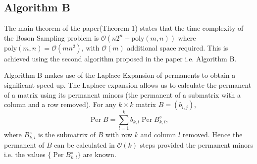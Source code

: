 \documentclass[11pt]{article}
\theoremstyle{theorem}
\theoremstyle{remark}
\theoremstyle{plain}
\theoremstyle{definition}
\DeclareMathOperator*{\Per}{\mathrm{Per}}
\begin{document}
\subsection{Algorithm B} \label{sec:algB}
The main theorem of the paper(Theorem 1) states that the time complexity of the Boson Sampling problem is $\mathcal{O}(n2^n + \text{poly}(m, n))$ where $ \text{poly}(m, n) = \mathcal{O}(mn^2)$, with $\mathcal{O}(m)$ additional space required. This is achieved using the second algorithm proposed in the paper i.e. Algorithm B.

Algorithm B makes use of the Laplace Expansion \cite{marcus_minc66} of permanents to obtain a significant speed up. The Laplace expansion allows us to calculate the permanent of a matrix using its permanent minors (the permanent of a submatrix with a column and a row removed). For any $k \times k$ matrix $B = (b_{i,j})$,
\begin{equation}
\Per B = \sum_{l=1}^k b_{k, l} \Per B_{k, l}^{\diamond},
\end{equation}
where $B_{k, l}^{\diamond}$  is the submatrix of $B$ with row $k$ and column $l$ removed. Hence the permanent of $B$ can be calculated in $\mathcal{O}(k)$ steps provided the permanent minors i.e. the values $\{ \Per B_{k, l}^{\diamond} \}$ are known.
\end{document}
